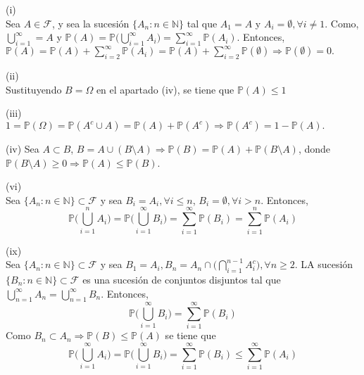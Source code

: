 \begin{dem}(i)\\
Sea $A\in\mathcal{F}$, y sea la sucesión $\{ A_n:n\in\mathbb{N}\}$ tal que $A_1 = A$ y $A_i = \emptyset, \forall i\neq 1$. Como, $\bigcup_{i=1}^\infty = A$ y $\mathbb{P}(A) = \mathbb{P} \big(\bigcup_{i=1}^\infty A_i \big) = \sum_{i=1}^\infty \mathbb{P}(A_i)$. Entonces, $\mathbb{P}(A) = \mathbb{P}(A) + \sum_{i=2}^\infty \mathbb{P}(A_i) = \mathbb{P}(A) + \sum_{i=2}^\infty \mathbb{P}(\emptyset) \Rightarrow \mathbb{P}(\emptyset) = 0.$
\end{dem}

\begin{dem}(ii)\\
Sustituyendo $B = \Omega$ en el apartado (iv), se tiene que $\mathbb{P}(A) \leq 1$
\end{dem}

\begin{dem}(iii)\\
$1 = \mathbb{P}(\Omega) = \mathbb{P}(A^c \cup A) = \mathbb{P}(A) + \mathbb{P}(A^c) \Rightarrow \mathbb{P}(A^c) = 1- \mathbb{P}(A).$
\end{dem}

\begin{dem}(iv)
Sea $A\subset B$, $B = A\cup (B\setminus A) \Rightarrow \mathbb{P}(B) = \mathbb{P}(A) + \mathbb{P}(B\setminus A)$, donde $\mathbb{P}(B\setminus A) \geq 0 \Rightarrow \mathbb{P}(A) \leq \mathbb{P}(B)$.
\end{dem}

\begin{dem}(vi)\\
Sea $\{ A_n:n\in\mathbb{N}\}\subset\mathcal{F}$ y sea $B_i = A_i, \forall i\leq n$, $B_i = \emptyset, \forall i > n$. Entonces, \[ \mathbb{P}\bigg(\bigcup_{i=1}^n A_i \bigg) = \mathbb{P}\bigg(\bigcup_{i=1}^\infty B_i \bigg) = \sum_{i=1}^\infty \mathbb{P}(B_i) = \sum_{i=1}^n \mathbb{P}(A_i) \]
\end{dem}

\begin{dem}(ix)\\
Sea $\{ A_n:n\in\mathbb{N}\}\subset\mathcal{F}$ y sea $B_1 = A_i, B_n = A_n \cap \big(\bigcap_{i=1}^{n-1} A_i^c \big), \forall n \geq 2$. LA sucesión $\{ B_n:n\in\mathbb{N}\}\subset\mathcal{F}$ es una sucesión de conjuntos disjuntos tal que $\bigcup_{n=1}^\infty A_n = \bigcup_{n=1}^\infty B_n$. Entonces, \[ \mathbb{P}\bigg(\bigcup_{i=1}^\infty B_i \bigg) = \sum_{i=1}^\infty \mathbb{P}(B_i) \] Como $B_n \subset A_n \Rightarrow \mathbb{P}(B) \leq \mathbb{P}(A)$ se tiene que \[ \mathbb{P}\bigg(\bigcup_{i=1}^\infty A_i \bigg) = \mathbb{P}\bigg(\bigcup_{i=1}^\infty B_i \bigg) = \sum_{i=1}^\infty \mathbb{P}(B_i) \leq \sum_{i=1}^\infty \mathbb{P}(A_i) \]
\end{dem}

